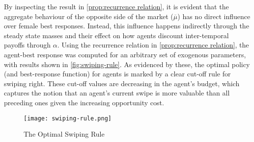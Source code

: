 
By inspecting the result in \autoref{prop:recurrence relation}, it is evident that the aggregate behaviour of the opposite side of the market ($\overline\mu$) has no direct influence over female best responses. Instead, this influence happens indirectly through the steady state masses and their effect on how agents discount inter-temporal payoffs through $\alpha$. Using the recurrence relation in \autoref{prop:recurrence relation}, the agent-best response was computed for an arbitrary set of exogenous parameters, with results shown in \autoref{fig:swiping-rule}. As evidenced by these, the optimal policy (and best-response function) for agents is marked by a clear cut-off rule for swiping right. These cut-off values are decreasing in the agent's budget, which captures the notion that an agent's current swipe is more valuable than all preceding ones given the increasing opportunity cost.  

\begin{figure}[ht]
    \centering
    \caption{The Optimal Swiping Rule}
    \texttt{[image: swiping-rule.png]}
    \label{fig:swiping-rule} 
\end{figure}

